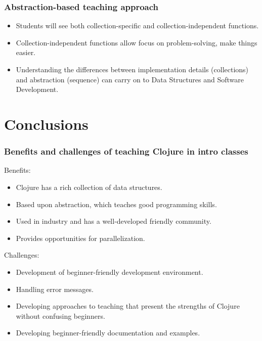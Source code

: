 \documentclass{beamer}
\newcommand{\allcomments}[1]{{#1}}
\newcommand{\joecomment}[1]{{\bf \color{JoesGold}{\allcomments{{#1}}}}}
\begin{document}
\begin{frame}
\frametitle{Abstraction-based teaching approach}
\begin{itemize}
\item Students will see both collection-specific and collection-independent functions. 
\item Collection-independent functions allow focus on problem-solving, make things easier. 
\item Understanding the differences between implementation details (collections) and abstraction (sequence) can carry on to Data Structures and Software Development. %
\end{itemize}
\end{frame}

\section{Conclusions}

\begin{frame}
\frametitle{Benefits and challenges of teaching Clojure in intro classes}
Benefits:
\begin{itemize}
\item Clojure has a rich collection of data structures.
\item Based upon abstraction, which teaches good programming skills. 
\item Used in industry and has a well-developed friendly community. 
\item Provides opportunities for parallelization. 
\end{itemize}
Challenges:
\begin{itemize}
\item Development of beginner-friendly development environment. 
\item Handling error messages.
\item Developing approaches to teaching that present the strengths of Clojure without confusing beginners. 
\item Developing beginner-friendly documentation and examples. 
\end{itemize}%
\end{frame}
\end{document}
